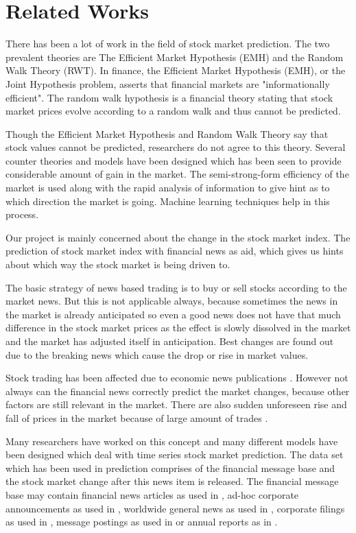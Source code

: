 \documentclass[review,twocolumn,5p]{elsarticle}
\begin{document}
\section{Related Works}
\label{sec:related-works}

There has been a lot of work in the field of stock market prediction. The two prevalent theories are The Efficient Market Hypothesis (EMH) and the Random Walk Theory (RWT). In finance, the Efficient Market Hypothesis (EMH), or the Joint Hypothesis problem, asserts that financial markets are "informationally efficient". The random walk hypothesis is a financial theory stating that stock market prices evolve according to a random walk and thus cannot be predicted.

Though the Efficient Market Hypothesis and Random Walk Theory say that stock values cannot be predicted, researchers do not agree to this theory. Several counter theories and models have been designed which has been seen to provide considerable amount of gain in the market. The semi-strong-form efficiency of the market is used along with the rapid analysis of information to give hint as to which direction the market is going. Machine learning techniques help in this process. 

Our project is mainly concerned about the change in the stock market index. The prediction of stock market index with financial news as aid, which gives us hints about which way the stock market is being driven to. 

The basic strategy of news based trading is to buy or sell stocks according to the market news. But this is not applicable always, because sometimes the news in the market is already anticipated so even a good news does not have that much difference in the stock market prices as the effect is slowly dissolved in the market and the market has adjusted itself in anticipation. Best changes are found out due to the breaking news which cause the drop or rise in market values. 

Stock trading has been affected due to economic news publications \cite{RePEc:eee:pacfin:v:9:y:2001:i:3:p:195-217}. However not always can the financial news correctly predict the market changes, because other factors are still relevant in the market. There are also sudden unforeseen rise and fall of prices in the market because of large amount of trades \cite{camerer1991information}. 

Many researchers have worked on this concept and many different models have been designed which deal with time series stock market prediction. The data set which has been used in prediction comprises of the financial message base and the stock market change after this news item is released. The financial message base may contain financial news articles as used in \cite{Schumaker:2009}\cite{JOFI:JOFI1362}\cite{1265201}, ad-hoc corporate announcements as used in \cite{conf/wirtschaftsinformatik/GrothM09}\cite{groth2011intraday}, worldwide general news as used in \cite{725072}, corporate filings as used in \cite{JOAR:JOAR382}, message postings as used in \cite{doi:10.1287/mnsc.1070.0704} or annual reports as in \cite{butler:2009}.
\end{document}
